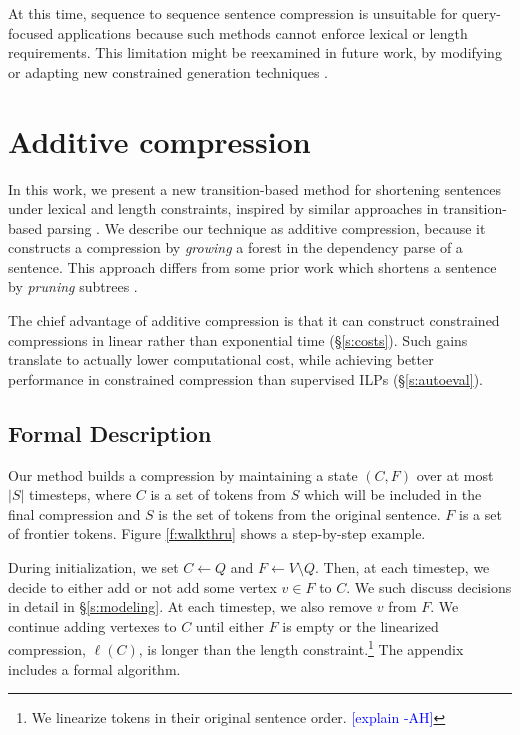 \documentclass[11pt,a4paper]{article}
\newcommand{\ahcomment}[1]{\textcolor{blue}{[#1 -AH]}}
\begin{document}
At this time, sequence to sequence sentence compression \cite{filippova2015sentence} is unsuitable for query-focused applications because such methods cannot enforce lexical or length requirements. This limitation might be reexamined in future work, by modifying or adapting new constrained generation techniques \cite{N18-1119,aaimh}.

\section{Additive compression}\label{s:system}

In this work, we present a new transition-based method for shortening sentences under lexical and length constraints, inspired by similar approaches in transition-based parsing \cite{nivre2003}. We describe our technique as additive compression, because it constructs a compression by \textit{growing} a forest in the dependency parse of a sentence. This approach differs from some prior work which
shortens a sentence by \textit{pruning} subtrees \cite{Jing2000SentenceRF,Knight2000StatisticsBasedS,berg2011jointly,almeida2013fast,Filippova2015FastKS,filippova2015sentence}. 

The chief advantage of additive compression is that it can construct constrained compressions in linear rather than exponential time (\S\ref{s:costs}). Such gains translate to actually lower computational cost, while achieving better performance in constrained compression than supervised ILPs (\S\ref{s:autoeval}).



\subsection{Formal Description}\label{s:formal}

Our method builds a compression by maintaining a state
$(C,F)$ over at most $|S|$ timesteps, where $C$ is a set of tokens from $S$ which will be included in the final compression and $S$ is the set of tokens from the original sentence. $F$ is a set of frontier tokens. Figure \ref{f:walkthru} shows a step-by-step example. 

During initialization, we set $C \gets Q$ and $F \gets V \setminus Q$. Then, at each timestep, we decide to either add or not add some vertex $v \in F$ to $C$. We such discuss decisions in detail in \S\ref{s:modeling}. At each timestep, we also remove $v$ from $F$. We continue adding vertexes to $C$ until either $F$ is empty or the linearized compression, $\ell(C)$, is longer than the length constraint.\footnote{We linearize tokens in their original sentence order. \ahcomment{explain}} The appendix includes a formal algorithm.
\end{document}
